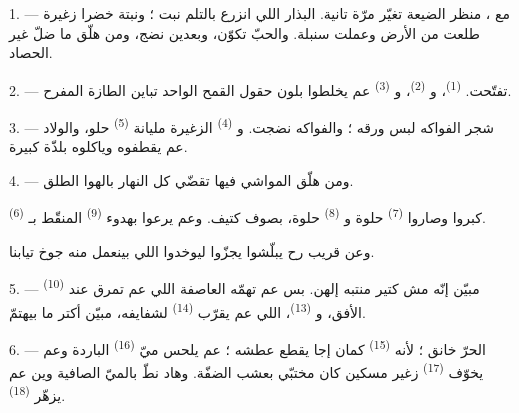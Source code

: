 
\VUsaut{5.0mm}
\VUsaut{3.0mm}
\VUsaut{3.0mm}
\VUsaut{4.0mm}
\VUsaut{3.0mm}

1. --- مع ، منظر الضيعة تغيّر مرّة تانية. البذار اللي
انزرع بالتلم نبت ؛ ونبتة خضرا زغيرة طلعت من الأرض وعملت سنبلة. والحبّ
تكوّن، وبعدين نضج، ومن هلّق ما ضلّ غير الحصاد.

2. ---  تفتّحت. 
\textsuperscript{(1)}، و \textsuperscript{(2)}،
و \textsuperscript{(3)} عم يخلطوا بلون حقول القمح
الواحد تباين  الطازة المفرح.

3. --- شجر الفواكه لبس ورقه ؛ والفواكه نضجت. و
\textsuperscript{(4)} الزغيرة مليانة  \textsuperscript{(5)} حلو،
والولاد عم يقطفوه وياكلوه بلذّة كبيرة.

4. --- ومن هلّق المواشي فيها تقضّي كل النهار بالهوا الطلق.

 \textsuperscript{(6)} كبروا وصاروا 
\textsuperscript{(7)} حلوة و \textsuperscript{(8)} حلوة، بصوف
كتيف. وعم يرعوا بهدوء   \textsuperscript{(9)}
المنقّط بـ.

وعن قريب رح يبلّشوا يجزّوا  ليوخدوا
 اللي بينعمل منه جوخ تيابنا.

\VUsaut{5.0mm}
\VUsaut{3.4mm}

5. ---  \textsuperscript{(10)} مبيّن إنّه مش كتير منتبه
إلهن. بس عم تهمّه العاصفة اللي عم تمرق عند الأفق، و
\textsuperscript{(13)}، اللي عم يقرّب  \textsuperscript{(14)}
لشفايفه، مبيّن أكتر ما بيهتمّ.

6. --- الحرّ خانق ؛ لأنه  \textsuperscript{(15)} كمان إجا
يقطع عطشه ؛ عم يلحس ميّ  \textsuperscript{(16)} الباردة وعم
يخوّف  \textsuperscript{(17)} زغير مسكين كان مختبّي بعشب
الضفّة. وهاد نطّ بالميّ الصافية وين عم يزهّر 
\textsuperscript{(18)}.

